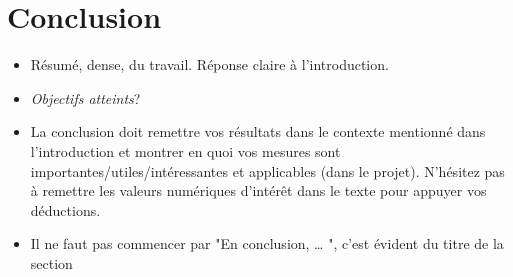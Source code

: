 \section{Conclusion}




\begin{itemize}
\item Résumé, dense, du travail. Réponse claire à l'introduction.
\item \textit{Objectifs atteints}?
\item La conclusion doit remettre vos résultats dans le contexte mentionné dans l'introduction et montrer en quoi vos mesures sont importantes/utiles/intéressantes et applicables (dans le projet). N'hésitez pas à remettre les valeurs numériques d'intérêt dans le texte pour appuyer vos déductions.
\item Il ne faut pas commencer par "En conclusion, … ", c'est évident du titre de la section
\end{itemize}